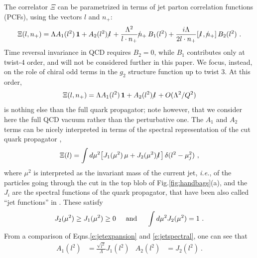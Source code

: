 \documentclass[preprintnumbers,floatfix,nofootinbib]{revtex4}
\newcommand{\lslash}{l \hspace{-0.19cm} / \,}
\newcommand{\nslash}{n \hspace{-0.24cm} / \,}
\begin{document}
The correlator $\Xi$ can be parametrized in terms of jet parton correlation
functions (PCFs), using the vectors $l$ and $n_+$: 
\begin{equation}
\Xi(l,n_+) = \Lambda A_1(l^2)\,{\bm 1} + A_2(l^2)\,\lslash 
+ \frac{\Lambda^2}{l \cdot n_{+}} \nslash_+ \, B_{1}(l^2)
+ \frac{i \Lambda}{2 l \cdot n_{+}} [\,\lslash,\nslash_+ ] \, B_{2}(l^2) \ .
\label{e:jetexpansion}
\end{equation} 
Time reversal invariance in QCD requires $B_{2}=0$, while $B_{1}$ contributes
only at twist-4 order, and will not be considered further in this paper. We
focus, instead, on the role of chiral odd terms in the $g_2$ structure function up to twist 3. At this order, 
\begin{equation}
  \Xi(l,n_+) = \Lambda A_1(l^2)\,{\bm 1} + A_2(l^2)\,\lslash 
    + O(\Lambda^2/Q^2)
\label{e:jetexpansion-tw3}
\end{equation} 
is nothing else than the full quark propagator; note however, that we consider
here the full QCD vacuum rather than the perturbative one.  
The $A_1$ and $A_2$ terms can be nicely interpreted in terms of the spectral representation of the cut quark propagator \cite{D'Hoker-lecture-notes,Romao-lecture-notes},
\begin{align} 
  \Xi(l) =  
  \int d \mu^2 \big[ J_1 (\mu^2)\,\mu + J_2 (\mu^2)\,\lslash \big] \,
  \delta(l^2 -\mu_j^2) \ ,
\label{e:jetspectral}
\end{align}
where $\mu^2$ is interpreted as the invariant mass of the current jet, {\it
  i.e.}, of the particles going through the cut in the top blob of
Fig.\ref{fig:handbags}(a), and the $J_i$ are the spectral functions of the
quark propagator, that have been also called ``jet functions'' in
\cite{Accardi:2008ne,SCET?}. These satisfy
\begin{align}
  J_2(\mu^2) \geq J_1(\mu^2) \geq 0
  \hspace*{0.5cm} \text{and} \hspace*{0.5cm}
  \int d\mu^2 J_2(\mu^2) = 1 \ .
\label{eq:jetfnsprops}
\end{align}
From a comparison of Eqns.\eqref{e:jetexpansion} and \eqref{e:jetspectral}, one can see that 
\begin{align}
  A_1(l^2)&=\frac{\sqrt{l^2}}{\Lambda}J_1(l^2) & A_2(l^2)&=J_2(l^2) \ .
  \label{eq:jet_vs_spectral}
\end{align}
\end{document}
